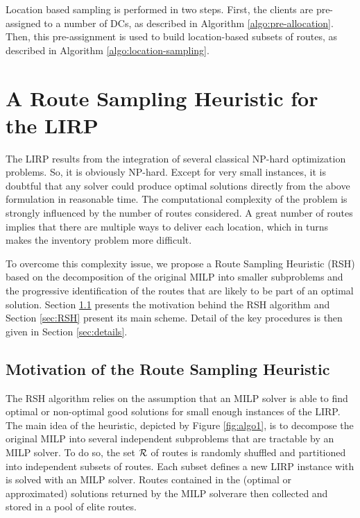 \documentclass[a4paper,10pt]{article}
\begin{document}
\begin{linenumbers}
Location based sampling is performed in two steps.
First, the clients are pre-assigned to a number of DCs, as described in Algorithm \ref{algo:pre-allocation}.
Then, this pre-assignment is used to build location-based subsets of routes, as described in Algorithm \ref{algo:location-sampling}.






\section{A Route Sampling Heuristic for the LIRP} 
\label{sec:algo}

The LIRP  results from the integration of several classical NP-hard optimization problems. So, it is obviously NP-hard.
Except for very small instances, it is doubtful that any solver could produce optimal solutions directly from the above formulation in reasonable time. The computational complexity of the problem is strongly influenced by the number of routes considered. A great number of routes implies that there are multiple ways to deliver each location, which in turns makes the inventory problem more difficult. 

To overcome this complexity issue, we propose a Route Sampling Heuristic (RSH) based on the decomposition 
of the original MILP into smaller subproblems and the progressive identification of the routes 
that are likely to be part of an optimal solution. 
Section \ref{sec:motivation} presents the motivation behind the RSH algorithm and Section \ref{sec:RSH} present its main scheme. Detail of the key procedures is then given in Section \ref{sec:details}. 


\subsection{Motivation of the Route Sampling Heuristic} \label{sec:motivation}

The RSH algorithm relies on the assumption that an MILP solver is able to find optimal or non-optimal good solutions for small enough instances of the LIRP. 
The main idea of the heuristic, depicted by Figure \ref{fig:algo1}, is to decompose the original MILP into several independent subproblems that are tractable by an MILP solver. To do so, the set $\mathcal{R}$ of routes is randomly shuffled and partitioned into independent subsets of routes. Each subset defines a new LIRP instance with is solved with an MILP solver. 
Routes contained in the (optimal or approximated) solutions returned by the MILP solverare then collected
and stored in a pool of elite routes. 


\end{linenumbers}
\end{document}
